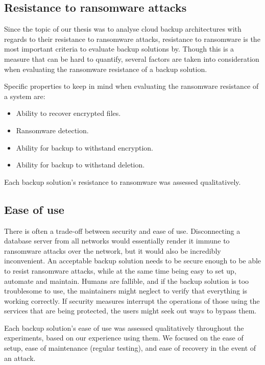 \subsection{Resistance to ransomware attacks}
Since the topic of our thesis was to analyse cloud backup architectures with regards to their resistance to ransomware attacks, resistance to ransomware is the most important criteria to evaluate backup solutions by. Though this is a measure that can be hard to quantify, several factors are taken into consideration when evaluating the 
ransomware resistance of a backup solution.


Specific properties to keep in mind when evaluating the ransomware resistance of a system are:
\begin{itemize}
    \item Ability to recover encrypted files.
    \item Ransomware detection. %
    \item Ability for backup to withstand encryption.
    \item Ability for backup to withstand deletion.
\end{itemize}

Each backup solution's resistance to ransomware was assessed qualitatively.

\subsection{Ease of use}

There is often a trade-off between security and ease of use. Disconnecting a database server from all networks would essentially render it immune to ransomware attacks over the network, but it would also be incredibly inconvenient. An acceptable backup solution needs to be secure enough to be able to  resist ransomware attacks, while at the same time being easy to set up, automate and maintain. Humans are fallible, and if the backup solution is too troublesome to use, the maintainers might neglect to verify that everything is working correctly.
If security measures interrupt the operations of those using the services that are being protected, the users might seek out ways to bypass them.

Each backup solution's ease of use was assessed qualitatively throughout the experiments, based on our experience using them. We focused on the ease of setup, ease of maintenance (regular testing), and ease of recovery in the event of an attack.

